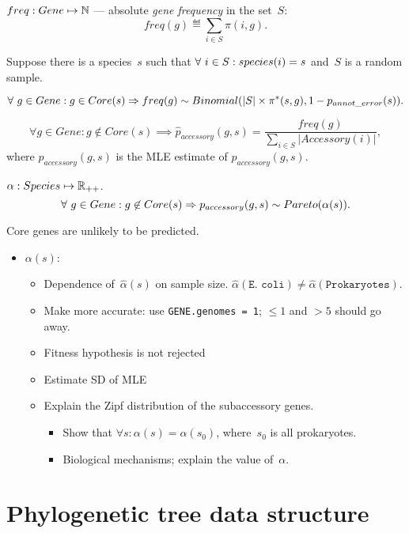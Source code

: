 \documentclass[10pt,a4paper]{article}
\theoremstyle{plain} \newtheorem{Lem}{Lemma}
\begin{document}
\begin{enumerate}
$freq: Gene \mapsto \mathbb N$ --- absolute {\em gene frequency} in the set~$S$:
$$ freq(g) \eqdef \sum_{i \in S} \pi(i,g). $$

Suppose there is a species~$s$ such that $\forall \  i \in S: species(i) = s$ and~$S$ is a random sample.

$$ \forall \  g \in Gene: g \in Core(s) \Rightarrow freq(g) \sim Binomial(|S|\times  \pi^*(s,g), 1 - p_{annot\_error}(s)). $$

$$ \forall g \in Gene: g \not\in Core(s) \implies \hat p_{accessory}(g,s) = \frac {freq(g)} {\sum_{i \in S} |Accessory(i)|}, $$
where $\hat p_{accessory}(g,s)$ is the MLE estimate of $p_{accessory}(g,s)$.

$\alpha: Species \mapsto \mathbb R_{++}$.
$$ \forall \  g \in Gene: g \not\in Core(s) \Rightarrow p_{accessory}(g,s) \sim Pareto(\alpha(s)). $$

\end{enumerate}


Core genes are unlikely to be predicted.


\Questions
\begin{itemize}
  \item $\alpha(s)$:
    \begin{itemize}
      \item Dependence of~$\hat \alpha(s)$ on sample size. $\hat \alpha(\texttt{E.~coli}) \ne \hat \alpha(\texttt{Prokaryotes})$.
      \item Make more accurate: use {\tt GENE.genomes = 1}; $\le 1$ and $> 5$ should go away.
      \item Fitness hypothesis is not rejected
      \item Estimate SD of MLE
      \item Explain the Zipf distribution of the subaccessory genes.
        \begin{itemize}
          \item Show that $\forall s: \alpha(s) = \alpha(s_0)$, where~$s_0$ is all prokaryotes.
          \item Biological mechanisms; explain the value of~$\alpha$.
        \end{itemize}
    \end{itemize}
\end{itemize}



\section{Phylogenetic tree data structure}
\end{document}
